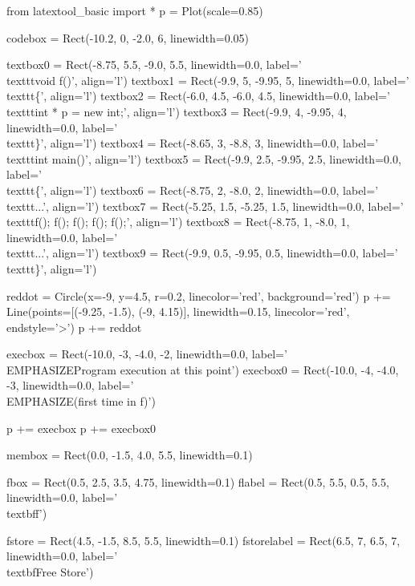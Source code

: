 \begin{python}
from latextool_basic import *
p = Plot(scale=0.85)

codebox = Rect(-10.2, 0, -2.0, 6, linewidth=0.05)

textbox0 = Rect(-8.75, 5.5, -9.0, 5.5, linewidth=0.0, label='\\texttt{void f()}', align='l')
textbox1 = Rect(-9.9, 5, -9.95, 5, linewidth=0.0, label='\\texttt{\{}', align='l')
textbox2 = Rect(-6.0, 4.5, -6.0, 4.5, linewidth=0.0, label='\\texttt{int * p = new int;}', align='l')
textbox3 = Rect(-9.9, 4, -9.95, 4, linewidth=0.0, label='\\texttt{\}}', align='l')
textbox4 = Rect(-8.65, 3, -8.8, 3, linewidth=0.0, label='\\texttt{int main()}', align='l')
textbox5 = Rect(-9.9, 2.5, -9.95, 2.5, linewidth=0.0, label='\\texttt{\{}', align='l')
textbox6 = Rect(-8.75, 2, -8.0, 2, linewidth=0.0, label='\\texttt{...}', align='l')
textbox7 = Rect(-5.25, 1.5, -5.25, 1.5, linewidth=0.0, label='\\texttt{f(); f(); f(); f(); f();}', align='l')
textbox8 = Rect(-8.75, 1, -8.0, 1, linewidth=0.0, label='\\texttt{...}', align='l')
textbox9 = Rect(-9.9, 0.5, -9.95, 0.5, linewidth=0.0, label='\\texttt{\}}', align='l')

reddot = Circle(x=-9, y=4.5, r=0.2, linecolor='red', background='red')
p += Line(points=[(-9.25, -1.5), (-9, 4.15)], linewidth=0.15, linecolor='red', endstyle='>')
p += reddot

execbox = Rect(-10.0, -3, -4.0, -2, linewidth=0.0,
               label='\\EMPHASIZE{Program execution at this point}')
execbox0 = Rect(-10.0, -4, -4.0, -3, linewidth=0.0,
               label='\\EMPHASIZE{(first time in f)}')

p += execbox
p += execbox0

membox = Rect(0.0, -1.5, 4.0, 5.5, linewidth=0.1)

fbox = Rect(0.5, 2.5, 3.5, 4.75, linewidth=0.1)
flabel = Rect(0.5, 5.5, 0.5, 5.5, linewidth=0.0, label='\\textbf{f}')

fstore = Rect(4.5, -1.5, 8.5, 5.5, linewidth=0.1)
fstorelabel = Rect(6.5, 7, 6.5, 7, linewidth=0.0, label='\\textbf{Free Store}')


\end{python}
